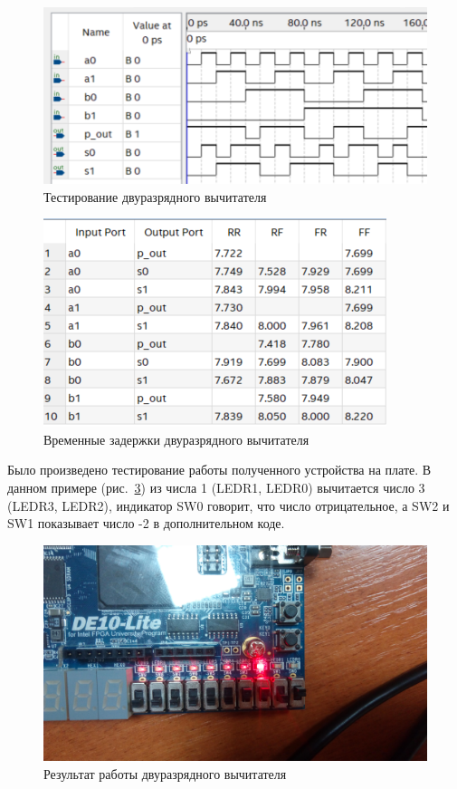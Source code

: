 \documentclass[a4paper,14pt]{article}
\begin{document}
\begin{figure}[H]
	\centering
	\includegraphics[width=0.5\linewidth]{image/wave_-}
	\caption{Тестирование двуразрядного вычитателя}
	\label{fig:wave_-}
\end{figure}

\begin{figure}[H]
	\centering
	\includegraphics[width=0.7\linewidth]{image/time_-}
	\caption{Временные задержки двуразрядного вычитателя}
	\label{fig:time_-}
\end{figure}

Было произведено тестирование работы полученного устройства на плате.
В данном примере (рис.~\ref{fig:demo}) из числа 1 (LEDR1, LEDR0) вычитается число 3 (LEDR3, LEDR2), индикатор SW0 говорит, что число отрицательное, а SW2 и SW1 показывает число -2 в дополнительном коде.

\begin{figure}[H]
	\centering
	\includegraphics[width=0.8\linewidth]{image/demo}
	\caption{Результат работы двуразрядного вычитателя}
	\label{fig:demo}
\end{figure}
\end{document}
